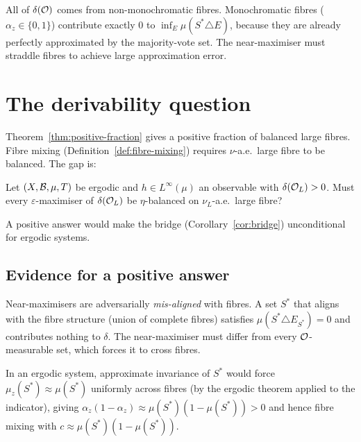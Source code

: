 \begin{remark}
All of $\delta(\mathcal{O})$ comes from non-monochromatic fibres.
Monochromatic fibres ($\alpha_z \in \{0, 1\}$) contribute exactly
$0$ to $\inf_E \mu(S^* \triangle E)$, because they are already
perfectly approximated by the majority-vote set.  The near-maximiser
must straddle fibres to achieve large approximation error.
\end{remark}

\section{The derivability question}
\label{sec:derivability}

Theorem~\ref{thm:positive-fraction} gives a positive fraction of
balanced large fibres.  Fibre mixing
(Definition~\ref{def:fibre-mixing}) requires $\nu$-a.e.\ large
fibre to be balanced.  The gap is:

\begin{question}[Derivability]
\label{q:derivability}
Let $(X, \mathcal{B}, \mu, T)$ be ergodic and $h \in L^\infty(\mu)$ an
observable with $\delta(\mathcal{O}_L) > 0$.  Must every
$\varepsilon$-maximiser of $\delta(\mathcal{O}_L)$ be $\eta$-balanced on
$\nu_L$-a.e.\ large fibre?
\end{question}

A positive answer would make the bridge
(Corollary~\ref{cor:bridge}) unconditional for ergodic systems.

\subsection*{Evidence for a positive answer}

Near-maximisers are adversarially \emph{mis-aligned} with fibres.
A set $S^*$ that aligns with the fibre structure (union of complete
fibres) satisfies $\mu(S^* \triangle E_{S^*}) = 0$ and contributes
nothing to $\delta$.  The near-maximiser must differ from every
$\mathcal{O}$-measurable set, which forces it to cross fibres.

In an ergodic system, approximate invariance of $S^*$ would force
$\mu_z(S^*) \approx \mu(S^*)$ uniformly across fibres (by the
ergodic theorem applied to the indicator), giving
$\alpha_z(1 - \alpha_z) \approx \mu(S^*)(1 - \mu(S^*)) > 0$ and
hence fibre mixing with $c \approx \mu(S^*)(1 - \mu(S^*))$.

